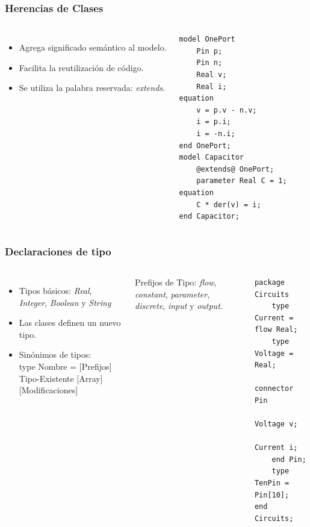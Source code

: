 \documentclass[aspectratio=169,10pt]{beamer}
\begin{document}
\begin{frame}[fragile]
\frametitle{Herencias de Clases} 
\begin{columns}  

\begin{itemize}
    \item Agrega significado semántico al modelo.
    \item Facilita la reutilización de código.
    \item Se utiliza la palabra reservada: \textit{extends}.
\end{itemize} 

\begin{lstlisting}[style=base]
model OnePort
    Pin p;
    Pin n;
    Real v;
    Real i;
equation
    v = p.v - n.v;
    i = p.i;
    i = -n.i;
end OnePort;
model Capacitor
    @extends@ OnePort;
    parameter Real C = 1;
equation
    C * der(v) = i;
end Capacitor;
\end{lstlisting}
\end{columns}
\end{frame}

\begin{frame}[fragile]
\frametitle{Declaraciones de tipo} 
\begin{columns}  
\column[t]{8cm}
    \begin{itemize}
        \item Tipos básicos: \textit{Real}, \textit{Integer}, \textit{Boolean} y \textit{String}
        \item Las clases definen un nuevo tipo.
        \item Sinónimos de tipos: \\ 
              type Nombre = [Prefijos] Tipo-Existente [Array] [Modificaciones]
    \end{itemize} 

Prefijos de Tipo: \textit{flow}, \textit{constant}, \textit{parameter}, \textit{discrete}, \textit{input} y \textit{output}.

\column[t]{5cm}
\begin{lstlisting}[style=base]
package Circuits
    type Current = flow Real;
    type Voltage = Real;
    connector Pin
        Voltage v;
        Current i;
    end Pin;
    type TenPin = Pin[10];
end Circuits;
\end{lstlisting}
\par
\end{columns}
\end{frame}
\end{document}
